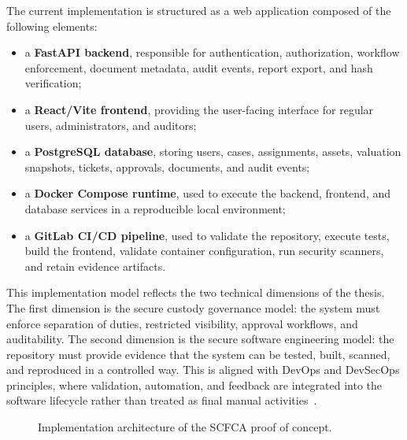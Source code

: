 \documentclass[12pt,a4paper]{report}
\begin{document}
The current implementation is structured as a web application composed of the following elements:

\begin{itemize}
    \item a \textbf{FastAPI backend}, responsible for authentication, authorization, workflow enforcement, document metadata, audit events, report export, and hash verification;
    \item a \textbf{React/Vite frontend}, providing the user-facing interface for regular users, administrators, and auditors;
    \item a \textbf{PostgreSQL database}, storing users, cases, assignments, assets, valuation snapshots, tickets, approvals, documents, and audit events;
    \item a \textbf{Docker Compose runtime}, used to execute the backend, frontend, and database services in a reproducible local environment;
    \item a \textbf{GitLab CI/CD pipeline}, used to validate the repository, execute tests, build the frontend, validate container configuration, run security scanners, and retain evidence artifacts.
\end{itemize}

This implementation model reflects the two technical dimensions of the thesis. The first dimension is the secure custody governance model: the system must enforce separation of duties, restricted visibility, approval workflows, and auditability. The second dimension is the secure software engineering model: the repository must provide evidence that the system can be tested, built, scanned, and reproduced in a controlled way. This is aligned with DevOps and DevSecOps principles, where validation, automation, and feedback are integrated into the software lifecycle rather than treated as final manual activities~\cite{Kim2016,Vehent2018}.

\begin{figure}[htbp]
    \centering
    \caption{Implementation architecture of the SCFCA proof of concept.}
    \label{fig:scfca-implementation-architecture}
\end{figure}
\end{document}
